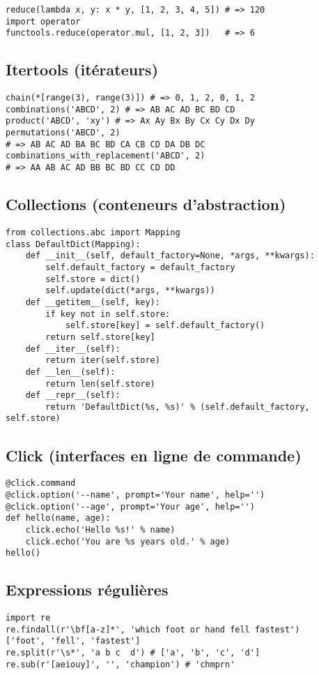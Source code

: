 \documentclass{article}
\begin{document}
\begin{multicols*}{4}
\begin{lstlisting}
reduce(lambda x, y: x * y, [1, 2, 3, 4, 5]) # => 120
import operator
functools.reduce(operator.mul, [1, 2, 3])   # => 6
\end{lstlisting}

\subsection*{Itertools (itérateurs)}
\begin{lstlisting}
chain(*[range(3), range(3)]) # => 0, 1, 2, 0, 1, 2
combinations('ABCD', 2) # => AB AC AD BC BD CD
product('ABCD', 'xy') # => Ax Ay Bx By Cx Cy Dx Dy
permutations('ABCD', 2)
# => AB AC AD BA BC BD CA CB CD DA DB DC
combinations_with_replacement('ABCD', 2)
# => AA AB AC AD BB BC BD CC CD DD
\end{lstlisting}

\subsection*{Collections (conteneurs d'abstraction)}
\begin{lstlisting}
from collections.abc import Mapping
class DefaultDict(Mapping):
    def __init__(self, default_factory=None, *args, **kwargs):
        self.default_factory = default_factory
        self.store = dict()
        self.update(dict(*args, **kwargs))
    def __getitem__(self, key):
        if key not in self.store:
            self.store[key] = self.default_factory()
        return self.store[key]
    def __iter__(self):
        return iter(self.store)
    def __len__(self):
        return len(self.store)
    def __repr__(self):
        return 'DefaultDict(%s, %s)' % (self.default_factory, self.store)
\end{lstlisting}

\subsection*{Click (interfaces en ligne de commande)}
\begin{lstlisting}
@click.command
@click.option('--name', prompt='Your name', help='')
@click.option('--age', prompt='Your age', help='')
def hello(name, age):
    click.echo('Hello %s!' % name)
    click.echo('You are %s years old.' % age)
hello()
\end{lstlisting}

\subsection*{Expressions régulières}
\begin{lstlisting}
import re
re.findall(r'\bf[a-z]*', 'which foot or hand fell fastest')
['foot', 'fell', 'fastest']
re.split(r'\s*', 'a b c  d') # ['a', 'b', 'c', 'd']
re.sub(r'[aeiouy]', '', 'champion') # 'chmprn'
\end{lstlisting}


\end{multicols*}
\end{document}
